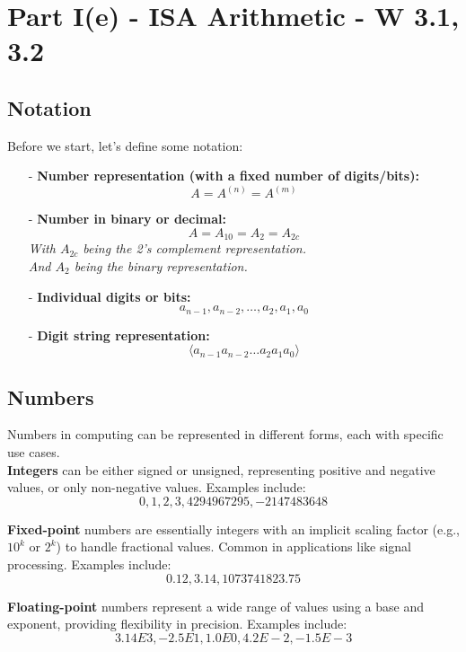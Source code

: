 \chapter{Part I(e) - ISA Arithmetic - W 3.1, 3.2}
\section{Notation}
Before we start, let's define some notation:
\begin{itemize}
    \item[-] \textbf{Number representation (with a fixed number of digits/bits):}
    \[
    A = A^{(n)} = A^{(m)}
    \]
    
    \item[-] \textbf{Number in binary or decimal:}
    \[
    A = A_{10} = A_{2} = A_{2c}
    \]
    \textit{With $A_{2c}$ being the 2's complement representation.} \\
    \textit{And $A_{2}$ being the binary representation.}
    \item[-] \textbf{Individual digits or bits:}
    \[
    a_{n-1}, a_{n-2}, \dots, a_2, a_1, a_0
    \]
    
    \item[-] \textbf{Digit string representation:}
    \[
    \langle a_{n-1} a_{n-2} \dots a_2 a_1 a_0 \rangle
    \]
\end{itemize}

\section{Numbers}

Numbers in computing can be represented in different forms, each with specific use cases. \\
\vspace*{5px}
\textbf{Integers} can be either signed or unsigned, representing positive and negative values, or only non-negative values. Examples include:
\[
0, 1, 2, 3, 4294967295, -2147483648
\]

\textbf{Fixed-point} numbers are essentially integers with an implicit scaling factor (e.g., \(10^k\) or \(2^k\)) to handle fractional values. Common in applications like signal processing. Examples include:
\[
0.12, 3.14, 1073741823.75
\]

\textbf{Floating-point} numbers represent a wide range of values using a base and exponent, providing flexibility in precision. Examples include:
\[
3.14E3, -2.5E1, 1.0E0, 4.2E-2, -1.5E-3
\]

